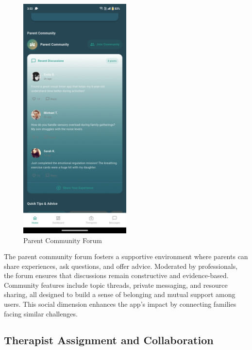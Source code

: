﻿\documentclass[12pt,a4paper]{article}
\newcommand{\sectiontitle}[1]{\subsection{#1}}
\begin{document}
\begin{figure}[H]
    \centering
    \includegraphics[width=0.5\textwidth]{Screenshots/parentcommunity.png}
    \caption{Parent Community Forum}
    \label{fig:parent-community}
\end{figure}
The parent community forum fosters a supportive environment where parents can share experiences, ask questions, and offer advice. Moderated by professionals, the forum ensures that discussions remain constructive and evidence-based. Community features include topic threads, private messaging, and resource sharing, all designed to build a sense of belonging and mutual support among users. This social dimension enhances the app's impact by connecting families facing similar challenges.

\sectiontitle{Therapist Assignment and Collaboration}
\end{document}
